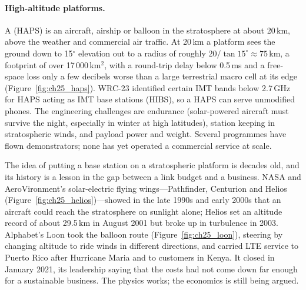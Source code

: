 \paragraph{High-altitude platforms.} A  (HAPS) is an aircraft,
airship or balloon in the stratosphere at about 20\,km, above the weather and commercial air
traffic. At 20\,km a platform sees the ground down to 15$^\circ$ elevation out to a radius of roughly
$20/\tan15^\circ\approx75$\,km, a footprint of over 17\,000\,km$^2$, with a round-trip delay below
0.5\,ms and a free-space loss only a few decibels worse than a large terrestrial macro cell at its
edge (Figure~\ref{fig:ch25_haps}). WRC-23 identified certain IMT bands below 2.7\,GHz for HAPS acting
as IMT base stations (HIBS), so a HAPS can serve unmodified phones. The engineering challenges are
endurance (solar-powered aircraft must survive the night, especially in winter at high latitudes),
station keeping in stratospheric winds, and payload power and weight. Several programmes have flown
demonstrators; none has yet operated a commercial service at scale.


\begin{history}
The idea of putting a base station on a stratospheric platform is decades old, and its history is a
lesson in the gap between a link budget and a business. NASA and AeroVironment's solar-electric
flying wings---Pathfinder, Centurion and Helios (Figure~\ref{fig:ch25_helios})---showed in the late
1990s and early 2000s that an aircraft could reach the stratosphere on sunlight alone; Helios set an
altitude record of about 29.5\,km in August 2001 but broke up in turbulence in 2003. Alphabet's Loon
took the balloon route (Figure~\ref{fig:ch25_loon}), steering by changing altitude to ride winds in
different directions, and carried LTE service to Puerto Rico after Hurricane Maria and to customers in
Kenya. It closed in January 2021, its leadership saying that the costs had not come down far enough
for a sustainable business. The physics works; the economics is still being argued.
\end{history}

